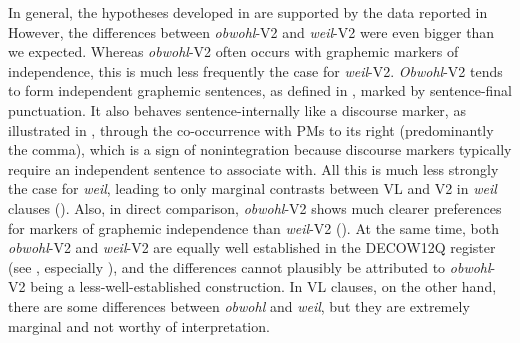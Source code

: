 In general, the hypotheses developed in  are supported by the data reported in  However, the differences between \textit{obwohl}{}-V2 and \textit{weil}{}-V2 were even bigger than we expected. Whereas \textit{obwohl}{}-V2 often occurs with graphemic markers of independence, this is much less frequently the case for \textit{weil}{}-V2. \textit{Obwohl}{}-V2 tends to form independent graphemic sentences, as defined in , marked by sentence-final punctuation. It also behaves sentence-internally like a discourse marker, as illustrated in , through the co-occurrence with PMs to its right (predominantly the comma), which is a sign of nonintegration because discourse markers typically require an independent sentence to associate with. All this is much less strongly the case for \textit{weil}, leading to only marginal contrasts between VL and V2 in \textit{weil} clauses (). Also, in direct comparison, \textit{obwohl}{}-V2 shows much clearer preferences for markers of graphemic independence than \textit{weil}{}-V2 (). At the same time, both \textit{obwohl}{}-V2 and \textit{weil}{}-V2 are equally well established in the DECOW12Q register (see , especially ), and the differences cannot plausibly be attributed to \textit{obwohl}{}-V2 being a less-well-established construction. In VL clauses, on the other hand, there are some differences between \textit{obwohl} and \textit{weil}, but they are extremely marginal and not worthy of interpretation.



